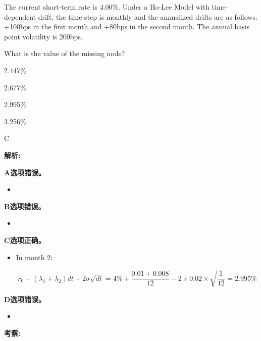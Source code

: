 \documentclass{article}
\newcounter{question} %
\newenvironment{explanation}
{\textbf{解析:}\par}
{\par}
\newcommand{\checklist}[1]{
    \textbf{考察:} #1 \par %
    \addcontentsline{toc}{subsection}{题号\thequestion 考察: #1} %
    \vspace{2em} %
}
\begin{document}
\begin{question}
    The current short-term rate is 4.00\%. Under a Ho-Lee Model with time-dependent drift, the
    time step is monthly and the annualized drifts are as follows: +100bps in the first month and
    +80bps in the second month. The annual basis point volatility is 200bps.


    What is the value of the missing node?

\end{question}

\begin{choices}
    \item 2.447\%
    \item 2.677\%
    \item 2.995\%
    \item 3.256\%
\end{choices}

\begin{correctanswer}
    C
\end{correctanswer}

\begin{explanation}
    \textbf{A选项错误。}
    \begin{itemize}
        \item 
    \end{itemize}
    \textbf{B选项错误。}
    \begin{itemize}
        \item 
    \end{itemize}
    \textbf{C选项正确。}
    \begin{itemize}
        \item In month 2:
        
\[
r_0 + (\lambda_1 + \lambda_2)dt - 2\sigma\sqrt{dt}
= 4\% + \frac{0.01 + 0.008}{12} - 2 \times 0.02 \times \sqrt{\frac{1}{12}}
= 2.995\%
\]
    \end{itemize}
    \textbf{D选项错误。}
    \begin{itemize}
        \item 
    \end{itemize}
\end{explanation}
\checklist{}
\end{document}
